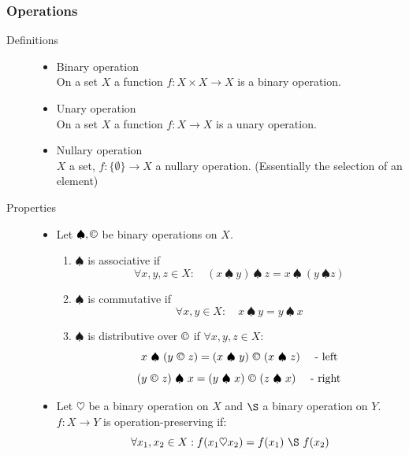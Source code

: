 \documentclass[margin=0px]{article}
\begin{document}
\subsubsection{Operations}
\begin{description}
    \item[Definitions] \hfill
        \begin{itemize}
            \item Binary operation \\
                  On a set $X$ a function $f : X \times X \rightarrow X$ is a binary operation.
            \item Unary operation \\
                  On a set $X$ a function $f : X \rightarrow X$ is a unary operation.
            \item Nullary operation \\
                  $X$ a set, $f : \{\emptyset \} \rightarrow X $ a nullary operation. (Essentially the selection of an element)
        \end{itemize}
    \item[Properties] \hfill
        \begin{itemize}
            \item Let $\spadesuit, \copyright$ be binary operations on $X$.
                  \begin{enumerate}
                      \item $\spadesuit$ is associative if
                            \[ \forall x,y,z \in X : \quad (x \ \spadesuit \ y ) \ \spadesuit \ z = x \  \spadesuit \  (y \ \spadesuit z) \]

                      \item $\spadesuit$ is commutative if
                            \[ \forall x,y \in X : \quad x \ \spadesuit \ y = y \  \spadesuit \  x \]

                      \item $\spadesuit$ is distributive over $\copyright$ if $\forall x,y,z \in X$:
                            \[ x \  \spadesuit \  (y \ \copyright \ z) = (x \  \spadesuit \ y) \ \copyright \ (x \ \spadesuit \ z) \quad \textrm{ - left} \]
                            \[ (y \ \copyright \ z) \  \spadesuit \ x = (y \  \spadesuit \ x) \ \copyright \ (z \ \spadesuit \ x) \quad \textrm{ - right} \]
                  \end{enumerate}

            \item Let $\heartsuit$ be a binary operation on $X$ and $\S$ a binary operation on $Y$.
                  $f : X \rightarrow Y$ is operation-preserving if:
                  \[ \forall x_1,x_2 \in X:  f(x_1 \heartsuit x_2) = f(x_1) \ \S \ f(x_2) \]
        \end{itemize}
\end{description}
\end{document}
